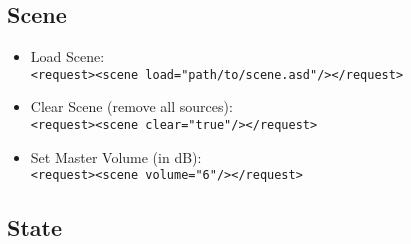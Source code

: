 %
%
%


%

\subsection{Scene}

\begin{itemize}
  \item Load Scene:\\
    \verb|<request><scene load="path/to/scene.asd"/></request>|
  \item Clear Scene (remove all sources):\\
    \verb|<request><scene clear="true"/></request>|
  \item Set Master Volume (in dB):\\
    \verb|<request><scene volume="6"/></request>|
\end{itemize}

\subsection{State}

